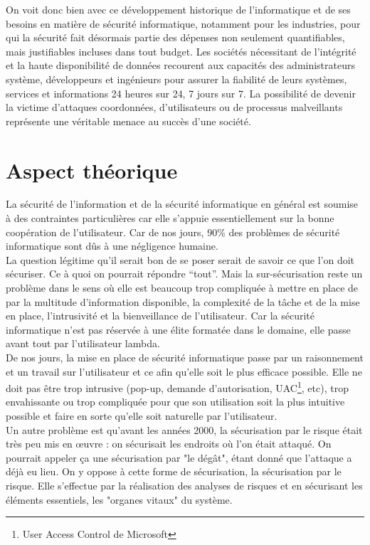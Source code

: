 \documentclass[a4paper]{memoir}
\begin{document}
On voit donc bien avec ce développement historique de l'informatique et de ses besoins en matière de sécurité informatique, notamment pour les industries, pour qui la sécurité fait désormais partie des dépenses non seulement quantifiables, mais justifiables incluses dans tout budget. Les sociétés nécessitant de l'intégrité et la haute disponibilité de données recourent aux capacités des administrateurs système, développeurs et ingénieurs pour assurer la fiabilité de leurs systèmes, services et informations 24 heures sur 24, 7 jours sur 7. La possibilité de devenir la victime d'attaques coordonnées, d'utilisateurs ou de processus malveillants représente une véritable menace au succès d'une société. 

\chapter{Aspect théorique}

La sécurité de l'information et de la sécurité informatique en général est soumise à des contraintes particulières car elle s'appuie essentiellement sur la bonne coopération de l'utilisateur. Car de nos jours, 90\% des problèmes de sécurité informatique sont dûs à une négligence humaine.\\
La question légitime qu'il serait bon de se poser serait de savoir ce que l'on doit sécuriser. Ce à quoi on pourrait répondre ``tout''. Mais la sur-sécurisation reste un problème dans le sens où elle est beaucoup trop compliquée à mettre en place de par la multitude d'information disponible, la complexité de la tâche et de la mise en place, l'intrusivité et la bienveillance de l'utilisateur. Car la sécurité informatique n'est pas réservée à une élite formatée dans le domaine, elle passe avant tout par l'utilisateur lambda.\\
De nos jours, la mise en place de sécurité informatique passe par un raisonnement et un travail sur l'utilisateur et ce afin qu'elle soit le plus efficace possible. Elle ne doit pas être trop intrusive (pop-up, demande d'autorisation, UAC\footnote{User Access Control de Microsoft}, etc), trop envahissante ou trop compliquée pour que son utilisation soit la plus intuitive possible et faire en sorte qu'elle soit naturelle par l'utilisateur.\\

Un autre problème est qu'avant les années 2000, la sécurisation par le risque était très peu mis en œuvre : on sécurisait les endroits où l'on était attaqué. On pourrait appeler ça une sécurisation par "le dégât", étant donné que l'attaque a déjà eu lieu.
On y oppose à cette forme de sécurisation, la sécurisation par le risque. Elle s'effectue par la réalisation des analyses de risques et en sécurisant les éléments essentiels, les "organes vitaux" du système.
\end{document}
